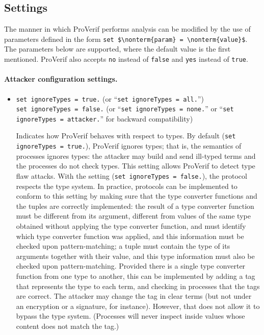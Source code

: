 \documentclass{book}
\newcommand{\nonterm}[1]{\langle\mathit{#1}\rangle}
\begin{document}
\subsection{Settings}\label{sec:settings}

The manner in which ProVerif performs analysis can be modified by the use of parameters defined in the form \lstinline!set $\nonterm{param} = \nonterm{value}$!. The parameters below are supported, where the default value is the first mentioned. ProVerif also accepts \lstinline{no} instead of \lstinline{false} and \lstinline{yes} instead of \lstinline{true}.

\paragraph{Attacker configuration settings.}
\begin{itemize}

\item \lstinline{set ignoreTypes = true.} (or ``\lstinline{set ignoreTypes = all.}'')\\
\lstinline{set ignoreTypes = false.} (or ``\lstinline{set ignoreTypes = none.}'' or ``\lstinline{set ignoreTypes = attacker.}'' for backward compatibility)

Indicates how ProVerif behaves with respect to types. By default (\lstinline{set} \lstinline{ignoreTypes = true.}), ProVerif ignores types; that is, the semantics of processes ignores types: the attacker may build and send ill-typed terms and the processes do not check types. This setting allows ProVerif to detect type flaw attacks.
%
With the setting (\lstinline{set ignoreTypes = false.}), the protocol respects the type system. In practice, protocols can be implemented to conform to this setting by making sure that the type converter functions and the tuples are correctly implemented: the result of a type converter function must be different from its argument, different from values of the same type obtained without applying the type converter function, and must identify which type converter function was applied, and this information must be checked upon pattern-matching; a tuple must contain the type of its arguments together with their value, and this type information must also be checked upon pattern-matching.
Provided there is a single type converter function from one type to another, this can be implemented by adding a tag that represents the type to each term, and checking in processes that the tags are correct. The attacker may change the tag in clear terms (but not under an encryption or a signature, for instance). However, that does not allow it to bypass the type system. (Processes will never inspect inside values whose content does not match the tag.)


\end{itemize}
\end{document}
